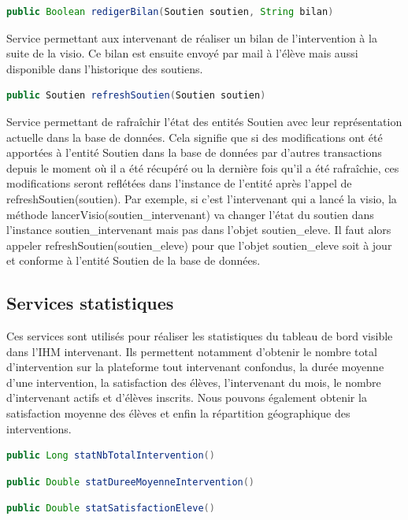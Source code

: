 \begin{lstlisting}[language = Java]
public Boolean redigerBilan(Soutien soutien, String bilan)
\end{lstlisting}
Service permettant aux intervenant de réaliser un bilan de l'intervention à la suite de la visio. Ce bilan est ensuite envoyé par mail à l'élève mais aussi disponible dans l'historique des soutiens.

\begin{lstlisting}[language = Java]
public Soutien refreshSoutien(Soutien soutien)
\end{lstlisting}
Service permettant de rafraîchir l'état des entités Soutien avec leur représentation actuelle dans la base de données. Cela signifie que si des modifications ont été apportées à l'entité Soutien dans la base de données par d'autres transactions depuis le moment où il a été récupéré ou la dernière fois qu'il a été rafraîchie, ces modifications seront reflétées dans l'instance de l'entité après l'appel de refreshSoutien(soutien). Par exemple, si c'est l'intervenant qui a lancé la visio, la méthode lancerVisio(soutien\_intervenant) va changer l'état du soutien dans l'instance soutien\_intervenant mais pas dans l'objet soutien\_eleve. Il faut alors appeler refreshSoutien(soutien\_eleve) pour que l'objet soutien\_eleve soit à jour et conforme à l'entité Soutien de la base de données.

\subsection{Services statistiques}
Ces services sont utilisés pour réaliser les statistiques du tableau de bord visible dans l'IHM intervenant. Ils permettent notamment d'obtenir le nombre total d'intervention sur la plateforme tout intervenant confondus, la durée moyenne d'une intervention, la satisfaction des élèves, l'intervenant du mois, le nombre d'intervenant actifs et d'élèves inscrits. Nous pouvons également obtenir la satisfaction moyenne des élèves et enfin la répartition géographique des interventions.
\begin{lstlisting}[language = Java]
public Long statNbTotalIntervention()
\end{lstlisting}

\begin{lstlisting}[language = Java]
public Double statDureeMoyenneIntervention()
\end{lstlisting}

\begin{lstlisting}[language = Java]
public Double statSatisfactionEleve()
\end{lstlisting}


